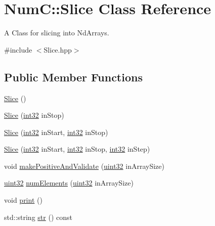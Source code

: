 \hypertarget{class_num_c_1_1_slice}{}\section{NumC\+:\+:Slice Class Reference}
\label{class_num_c_1_1_slice}


A Class for slicing into Nd\+Arrays.  




{\ttfamily \#include $<$Slice.\+hpp$>$}

\subsection*{Public Member Functions}
\begin{DoxyCompactItemize}
\item 
\mbox{\hyperlink{class_num_c_1_1_slice_a56efe4551fe9b0f75283abee2b036b80}{Slice}} ()
\item 
\mbox{\hyperlink{class_num_c_1_1_slice_acb851855afd73f625da0cded5d66f60a}{Slice}} (\mbox{\hyperlink{namespace_num_c_aa5a7e69266097d55816d4cdb19542b53}{int32}} in\+Stop)
\item 
\mbox{\hyperlink{class_num_c_1_1_slice_af304ab5aaca67f7213ec55e969d1fab0}{Slice}} (\mbox{\hyperlink{namespace_num_c_aa5a7e69266097d55816d4cdb19542b53}{int32}} in\+Start, \mbox{\hyperlink{namespace_num_c_aa5a7e69266097d55816d4cdb19542b53}{int32}} in\+Stop)
\item 
\mbox{\hyperlink{class_num_c_1_1_slice_aa70bf9a129371e3680688221f20fe85f}{Slice}} (\mbox{\hyperlink{namespace_num_c_aa5a7e69266097d55816d4cdb19542b53}{int32}} in\+Start, \mbox{\hyperlink{namespace_num_c_aa5a7e69266097d55816d4cdb19542b53}{int32}} in\+Stop, \mbox{\hyperlink{namespace_num_c_aa5a7e69266097d55816d4cdb19542b53}{int32}} in\+Step)
\item 
void \mbox{\hyperlink{class_num_c_1_1_slice_ae16d83808701213c8ac0d0313ae72f56}{make\+Positive\+And\+Validate}} (\mbox{\hyperlink{namespace_num_c_ae685802ca6d3035f2b400b081e3953fa}{uint32}} in\+Array\+Size)
\item 
\mbox{\hyperlink{namespace_num_c_ae685802ca6d3035f2b400b081e3953fa}{uint32}} \mbox{\hyperlink{class_num_c_1_1_slice_aed7a6610a9c98c8b41f336fc8f71d94c}{num\+Elements}} (\mbox{\hyperlink{namespace_num_c_ae685802ca6d3035f2b400b081e3953fa}{uint32}} in\+Array\+Size)
\item 
void \mbox{\hyperlink{class_num_c_1_1_slice_aa5c337ad7e0b8606fdde5227b00fe8e9}{print}} ()
\item 
std\+::string \mbox{\hyperlink{class_num_c_1_1_slice_a378c6115e027aa6f91a22fe246403e0a}{str}} () const
\end{DoxyCompactItemize}
